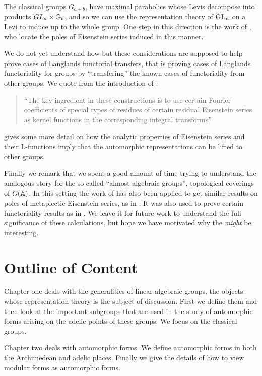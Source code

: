 The classical groups \(G_{a+b}\), have maximal parabolics whose Levis decompose into products \(GL_a\times \G_{b}\), and so we can use the representation theory of \(\operatorname{GL}_n\) on a Levi to induce up to the whole group. One step in this direction is the work of \cite{jiangPolesCertainResidual2013}, who locate the poles of Eisenstein series induced in this manner. 

We do not yet understand how but these considerations are supposed to help prove cases of Langlands functorial transfers, that is proving cases of Langlands functoriality for groups by ``transfering'' the known cases of functoriality from other groups. We quote from the introduction of \cite{jiangPolesCertainResidual2013}:

\begin{quote}
	``The key ingredient in these constructions is to use certain Fourier coefficients of special types of residues of certain residual Eisenstein series as kernel functions in the corresponding integral transforms''
\end{quote}
\cite{bumpRankinSelbergMethodIntroduction2011} gives some more detail on how the analytic properties of Eisenstein series and their L-functions imply that the automorphic representations can be lifted to other groups. 

Finally we remark that we spent a good amount of time trying to understand the analogous story for the so called ``almost algebraic groups'', topological coverings of \(G(\A)\). In this setting the work of \cite{jiangPolesCertainResidual2013} has also been applied to get similar results on poles of metaplectic Eisenstein series, as in \cite{kaplanDoublingConstructionsComplete2021}. It was also used to prove certain functoriality results as in \cite{caiDoublingConstructionsGlobal2024}. We leave it for future work to understand the full significance of these calculations, but hope we have motivated why the \textit{might} be interesting.

\section*{Outline of Content}
Chapter one deals with the generalities of linear algebraic groups, the objects whose representation theory is the subject of discussion. First we define them and then look at the important subgroups that are used in the study of automorphic forms arising on the adelic points of these groups. We focus on the classical groups.

Chapter two deals with automorphic forms. We define automorphic forms in both the Archimedean and adelic places. Finally we give the details of how to view modular forms as automorphic forms. 

